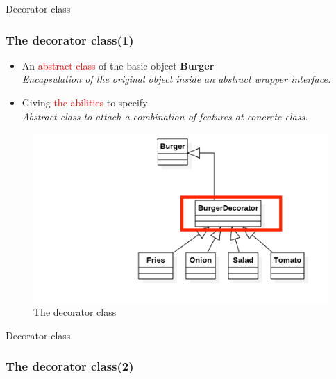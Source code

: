\documentclass{beamer}
\begin{document}
  \begin{frame}{Decorator class}
    \frametitle{The decorator class(1)}
    \begin{itemize}
      \item An \textcolor{red}{abstract class} of the basic object \textbf{Burger} \\
      \textit{Encapsulation of the original object inside an abstract wrapper interface.}
      \item Giving \textcolor{red}{the abilities} to specify \\
      \textit{Abstract class to attach a combination of features at concrete class.}

    \end{itemize}
    \begin{figure}[!b]
      \centering
      \includegraphics[scale=0.27]{Decorator}
      \caption{The decorator class}
    \end{figure}
  \end{frame}

  \begin{frame}{Decorator class}
    \frametitle{The decorator class(2)}
    
  \end{frame}
\end{document}
